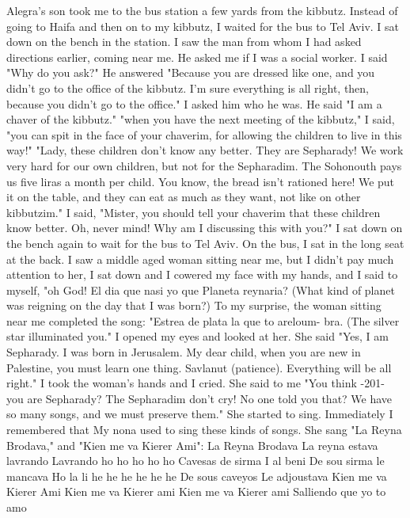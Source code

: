 
Alegra's son took me to the bus station a few yards from the 
kibbutz.
Instead of going to Haifa and then on to my kibbutz, I waited 
for the bus to Tel Aviv.
I sat down on the bench in the station.
I 
saw the man from whom I had asked directions earlier, coming near me.
He asked me if I was a social worker.
I said "Why do you ask?"
He answered "Because you are dressed like one, and you didn't go 
to the office of the kibbutz.
I'm sure everything is all right, then, 
because you didn't go to the office."
I asked him who he was.
He said "I am a chaver of the kibbutz."
"when you have the next meeting of the kibbutz," I said, "you can 
spit in the face of your chaverim, for allowing the children to live 
in this way!"
"Lady, these children don't know any better.
They are Sepharady!
We work very hard for our own children, but not for the Sepharadim.
The
Sohonouth pays us five liras a month per child.
You know, the bread 
isn't rationed here!
We put it on the table, and they can eat as much 
as they want, not like on other kibbutzim."
I said, "Mister, you should tell your chaverim that these children know better.
Oh, never mind!
Why am I discussing this with you?"
I sat down on the bench again to wait for the bus to Tel Aviv.
On the bus, I sat in the long seat at the back.
I saw a middle 
aged woman sitting near me, but I didn't pay much attention to her, I 
sat down and I cowered my face with my hands, and I said to myself, "oh 
God!
El dia que nasi yo que Planeta reynaria?
(What kind of planet 
was reigning on the day that I was born?)
To my surprise, the woman 
sitting near me completed the song: "Estrea de plata la que to areloum-
bra.
(The silver star illuminated you."
I opened my eyes and looked 
at her.
She said "Yes, I am Sepharady.
I was born in Jerusalem.
My 
dear child, when you are new in Palestine, you must learn one thing.
Savlanut (patience).
Everything will be all right."
I took the woman's hands and I cried.
She said to me "You think 
-201- 
you are Sepharady?
The Sepharadim don't cry!
No one told you that?
We have so many songs, and we must preserve them."
She started to 
sing.
Immediately I remembered that My nona used to sing these kinds 
of songs.
She sang "La Reyna Brodava," and "Kien me va Kierer Ami": 
La Reyna Brodava 
La reyna estava lavrando 
Lavrando ho ho ho ho ho 
Cavesas de sirma 
I al beni 
De sou sirma le mancava 
Ho la li he he he he he he 
De sous caveyos 
Le adjoustava 
Kien me va Kierer Ami 
Kien me va Kierer ami 
Kien me va Kierer ami 
Salliendo que yo to amo 
